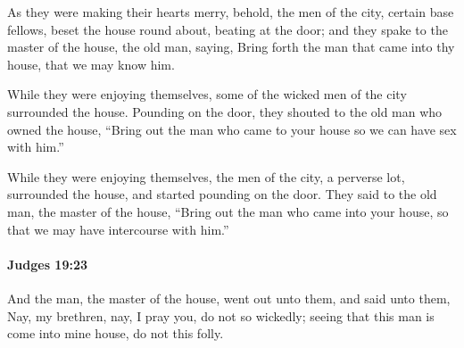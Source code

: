 			\begin{versebox}
					\item[BHS] 
					\item[ASV] As they were making their hearts merry, behold, the men of the city, certain base fellows, beset the house round about, beating at the door; and they spake to the master of the house, the old man, saying, Bring forth the man that came into thy house, that we may know him.
					\item[NIV] While they were enjoying themselves, some of the wicked men of the city surrounded the house. Pounding on the door, they shouted to the old man who owned the house, “Bring out the man who came to your house so we can have sex with him.”
					\item[NRSV] While they were enjoying themselves, the men of the city, a perverse lot, surrounded the house, and started pounding on the door. They said to the old man, the master of the house, “Bring out the man who came into your house, so that we may have intercourse with him.”
			\end{versebox}

		\paragraph{Judges 19:23} %
			\label{JUDGES-19-23}

			And the man, the master of the house, went out unto them, and said unto them, Nay, my brethren, nay, I pray you, do not so wickedly; seeing that this man is come into mine house, do not this folly.

